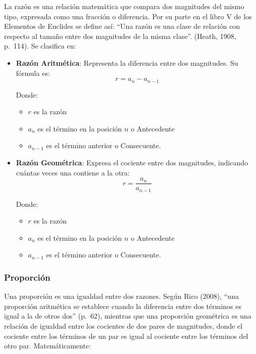 \documentclass[
  stu,
  floatsintext,
  longtable,
  a4paper,
  nolmodern,
  notxfonts,
  notimes,
  colorlinks=true,linkcolor=blue,citecolor=blue,urlcolor=blue]{apa7}
\begin{document}
La razón es una relación matemática que compara dos magnitudes del mismo
tipo, expresada como una fracción o diferencia. Por su parte en el libro
V de los Elementos de Euclides se define así: ``Una razón es una clase
de relación con respecto al tamaño entre dos magnitudes de la misma
clase''. (Heath, 1908, p.~114). Se clasifica en:

\begin{itemize}
\item
  \textbf{Razón Aritmética}: Representa la diferencia entre dos
  magnitudes. Su fórmula es: \[
  r = a_n - a_{n-1}
  \]

  Donde:

  \begin{itemize}
  \item
    \(r\) es la razón
  \item
    \(a_n\) es el término en la posición \(n\) o Antecedente
  \item
    \(a_{n-1}\) es el término anterior o Consecuente.
  \end{itemize}
\item
  \textbf{Razón Geométrica}: Expresa el cociente entre dos magnitudes,
  indicando cuántas veces una contiene a la otra: \[
  r = \frac{a_n}{a_{n-1}}
  \]

  Donde:

  \begin{itemize}
  \item
    \(r\) es la razón
  \item
    \(a_n\) es el término en la posición \(n\) o Antecedente
  \item
    \(a_{n-1}\) es el término anterior o Consecuente.
  \end{itemize}
\end{itemize}

\subsubsection{Proporción}\label{proporciuxf3n}

Una proporción es una igualdad entre dos razones. Según Rico (2008),
``una proporción aritmética se establece cuando la diferencia entre dos
términos es igual a la de otros dos'' (p.~62), mientras que una
proporción geométrica es una relación de igualdad entre los cocientes de
dos pares de magnitudes, donde el cociente entre los términos de un par
es igual al cociente entre los términos del otro par. Matemáticamente:
\end{document}
